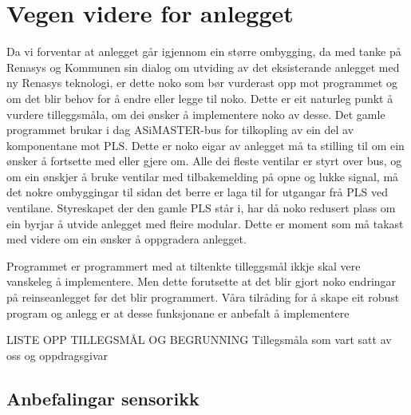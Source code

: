\section{Vegen videre for anlegget}
\thispagestyle{fancy}

Da vi forventar at anlegget går igjennom ein større ombygging, da med tanke på Renasys og Kommunen sin dialog om utviding av det eksisterande anlegget med ny Renasys teknologi, er dette noko som bør vurderast opp mot programmet og om det blir behov for å endre eller legge til noko. 
Dette er eit naturleg punkt å vurdere tilleggsmåla, om dei ønsker å implementere noko av desse.
Det gamle programmet brukar i dag ASiMASTER-bus for tilkopling av ein del av komponentane mot PLS. 
Dette er noko eigar av anlegget må ta stilling til om ein ønsker å fortsette med eller gjere om. Alle dei fleste ventilar er styrt over bus, og om ein ønskjer å bruke ventilar med tilbakemelding på opne og lukke signal, må det nokre ombyggingar til sidan det berre er laga til for utgangar frå PLS ved ventilane.
Styreskapet der den gamle PLS står i, har då noko redusert plass om ein byrjar å utvide anlegget med fleire modular. 
Dette er moment som må takast med videre om ein ønsker å oppgradera anlegget. 

Programmet er programmert med at tiltenkte tilleggsmål ikkje skal vere vanskeleg å implementere. 
Men dette forutsette at det blir gjort noko endringar på reinseanlegget før det blir programmert. 
Våra tilråding for å skape eit robust program og anlegg er at desse funksjonane er anbefalt å implementere

LISTE OPP TILLEGSMÅL OG BEGRUNNING
Tillegsmåla som vart satt av oss og oppdragsgivar

\subsection{Anbefalingar sensorikk}






\newpage

